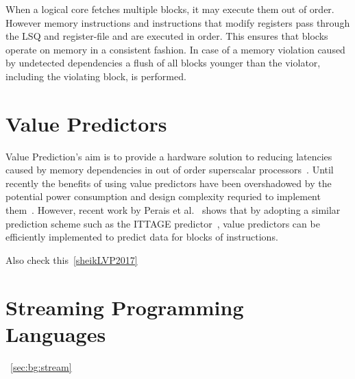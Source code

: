 When a logical core fetches multiple blocks, it may execute them out of order.
However memory instructions and instructions that modify registers pass through the LSQ and register-file and are executed in order.
This ensures that blocks operate on memory in a consistent fashion.
In case of a memory violation caused by undetected dependencies a flush of all blocks younger than the violator, including the violating block, is performed.


\section{Value Predictors}
Value Prediction's aim is to provide a hardware solution to reducing latencies caused by memory dependencies in out of order superscalar processors~\cite{gabbayVPOrig}.
Until recently the benefits of using value predictors have been overshadowed by the potential power consumption and design complexity requried to implement them~\cite{peraisVTAGE2014}.
However, recent work by Perais et al.~\cite{peraisVTAGE2014,peraisBeBop2015} shows that by adopting a similar prediction scheme such as the ITTAGE predictor~\cite{SeznecITTAGE}, value predictors can be efficiently implemented to predict data for blocks of instructions.

Also check this~\ref{sheikLVP2017}

\section{Streaming Programming Languages}~\ref{sec:bg:stream}


